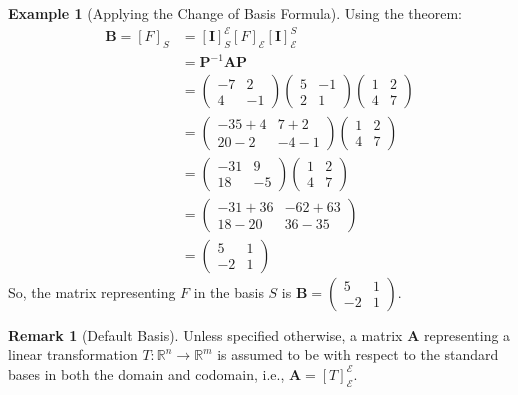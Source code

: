 \documentclass[12pt, letterpaper]{article}
\theoremstyle{definition}
\newtheorem{example}{Example}[section]
\newtheorem{remark}{Remark}[section]
\newcommand{\R}{\mathbb{R}}
\newcommand{\E}{\mathcal{E}}
\newcommand{\mat}[1]{\mathbf{#1}} %
\begin{document}
\begin{example}[Applying the Change of Basis Formula]
Using the theorem:
\begin{align*} \mat{B} = [F]_S &= [\mat{I}]_S^\E [F]_\E [\mat{I}]_\E^S \\ &= \mat{P}^{-1} \mat{A} \mat{P} \\ &= \begin{pmatrix} -7 & 2 \\ 4 & -1 \end{pmatrix} \begin{pmatrix} 5 & -1 \\ 2 & 1 \end{pmatrix} \begin{pmatrix} 1 & 2 \\ 4 & 7 \end{pmatrix} \\ &= \begin{pmatrix} -35+4 & 7+2 \\ 20-2 & -4-1 \end{pmatrix} \begin{pmatrix} 1 & 2 \\ 4 & 7 \end{pmatrix} \\ &= \begin{pmatrix} -31 & 9 \\ 18 & -5 \end{pmatrix} \begin{pmatrix} 1 & 2 \\ 4 & 7 \end{pmatrix} \\ &= \begin{pmatrix} -31+36 & -62+63 \\ 18-20 & 36-35 \end{pmatrix} \\ &= \begin{pmatrix} 5 & 1 \\ -2 & 1 \end{pmatrix} \end{align*}
So, the matrix representing $F$ in the basis $S$ is $\mat{B} = \begin{pmatrix} 5 & 1 \\ -2 & 1 \end{pmatrix}$.
\end{example}

\begin{remark}[Default Basis]
Unless specified otherwise, a matrix $\mat{A}$ representing a linear transformation $T: \R^n \to \R^m$ is assumed to be with respect to the standard bases in both the domain and codomain, i.e., $\mat{A} = [T]_\E^\E$.
\end{remark}
\end{document}
